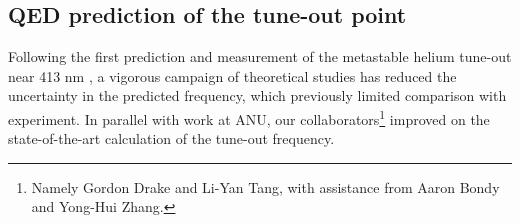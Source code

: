 
\subsection*{QED prediction of the tune-out point}
\label{sec:to_theory}
	Following the first prediction \cite{Mitroy13} and measurement  of the metastable helium  tune-out near 413 nm \cite{Henson15}, a vigorous campaign of theoretical studies \cite{Zhang16,ManaloThesis,Drake19,Zhang19, Pachucki19} has reduced the uncertainty in the predicted frequency, which previously limited comparison with experiment. In parallel with work at ANU, our collaborators\footnote{Namely Gordon Drake and Li-Yan Tang, with assistance from Aaron Bondy and Yong-Hui Zhang.} improved on the state-of-the-art calculation \cite{Zhang19} of the tune-out frequency.

